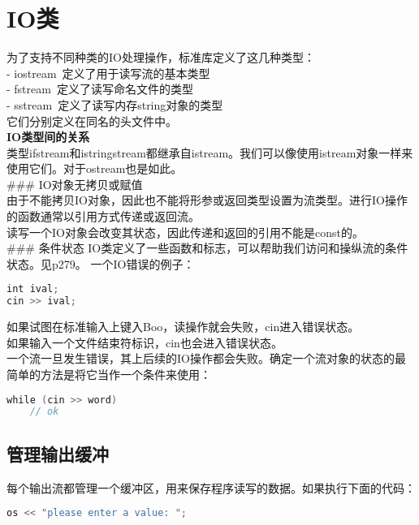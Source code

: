 \documentclass[
  a4paper,
  oneside,tablecaptionabove
]{scrbook}
\begin{document}
\section{IO类}\label{ioux7c7b}

为了支持不同种类的IO处理操作，标准库定义了这几种类型：\\
- iostream~定义了用于读写流的基本类型\\
- fstream~定义了读写命名文件的类型\\
- sstream~定义了读写内存string对象的类型\\
它们分别定义在同名的头文件中。\\
\textbf{IO类型间的关系}\\
类型ifstream和istringstream都继承自istream。我们可以像使用istream对象一样来使用它们。对于ostream也是如此。\\
\#\#\# IO对象无拷贝或赋值\\
由于不能拷贝IO对象，因此也不能将形参或返回类型设置为流类型。进行IO操作的函数通常以引用方式传递或返回流。\\
读写一个IO对象会改变其状态，因此传递和返回的引用不能是const的。\\
\#\#\# 条件状态
IO类定义了一些函数和标志，可以帮助我们访问和操纵流的条件状态。见p279。
一个IO错误的例子：

\begin{lstlisting}[language={C++}]
int ival;
cin >> ival;
\end{lstlisting}

如果试图在标准输入上键入Boo，读操作就会失败，cin进入错误状态。\\
如果输入一个文件结束符标识，cin也会进入错误状态。\\
一个流一旦发生错误，其上后续的IO操作都会失败。确定一个流对象的状态的最简单的方法是将它当作一个条件来使用：

\begin{lstlisting}[language={C++}]
while (cin >> word)
    // ok
\end{lstlisting}

\subsection{管理输出缓冲}\label{ux7ba1ux7406ux8f93ux51faux7f13ux51b2}

每个输出流都管理一个缓冲区，用来保存程序读写的数据。如果执行下面的代码：

\begin{lstlisting}[language={C++}]
os << "please enter a value: ";
\end{lstlisting}
\end{document}
